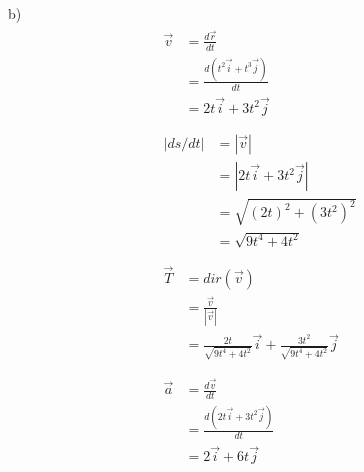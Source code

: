 \documentclass{article}
\begin{document}
b) 
\begin{gather*}
  \begin{split}
    \vec{v} &= \frac{d\vec{r}}{dt} \\
            &= \frac{d(t^2 \vec{i} + t^3 \vec{j})}{dt} \\
            &= 2t \vec{i} + 3t^2 \vec{j} \\
  \end{split} \\
  \begin{split}
    |ds/dt| &= |\vec{v}| \\
            &= |2t \vec{i} + 3t^2 \vec{j}| \\
            &= \sqrt{(2t)^2 + (3t^2)^2} \\
            &= \sqrt{9t^4 + 4t^2} \\
  \end{split} \\
  \begin{split}
    \vec{T} &= dir(\vec{v}) \\
            &= \frac{\vec{v}}{|\vec{v}|} \\
            &= \frac{2t}{\sqrt{9t^4 + 4t^2}} \vec{i} + \frac{3t^2}{\sqrt{9t^4 + 4t^2}} \vec{j} \\
  \end{split} \\
  \begin{split}
    \vec{a} &= \frac{d\vec{v}}{dt} \\
            &= \frac{d(2t \vec{i} + 3t^2 \vec{j})}{dt} \\
            &= 2 \vec{i} + 6t \vec{j} \\
  \end{split} \\
\end{gather*}
\end{document}
